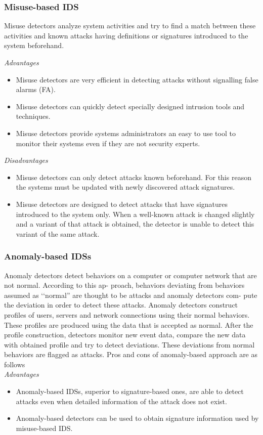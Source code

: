 \documentclass[12pt]{article}
\theoremstyle{definition}
\begin{document}
			\subsubsection{Misuse-based IDS}
			Misuse detectors analyze system activities and try to find a match between these activities and known attacks having
			definitions or signatures introduced to the system beforehand.
			
			\textit{Advantages}
			\begin{itemize}
				
				\item Misuse detectors are very efficient in detecting attacks without signalling false alarms (FA).
				
				\item Misuse detectors can quickly detect specially designed intrusion tools and techniques.
				\item Misuse detectors provide systems administrators an easy to use tool to monitor their systems even if they are not security
				experts.
			\end{itemize}
			
			\textit{Disadvantages}
			\begin{itemize}
				\item Misuse detectors can only detect attacks known beforehand. For this reason the systems must be updated with newly discovered attack signatures.
				
				\item Misuse detectors are designed to detect attacks that have signatures introduced to the system only. When a well-known attack is changed slightly and a variant of that attack is obtained, the detector is unable to detect this variant of the same attack.
			\end{itemize}
		
			\subsubsection{Anomaly-based IDSs}
			Anomaly detectors detect behaviors on a computer or computer network that are not normal. According to this ap-
			proach, behaviors deviating from behaviors assumed as ‘‘normal” are thought to be attacks and anomaly detectors com-
			pute the deviation in order to detect these attacks. Anomaly detectors construct profiles of users, servers and network
			connections using their normal behaviors. These profiles are produced using the data that is accepted as normal. After
			the profile construction, detectors monitor new event data, compare the new data with obtained profile and try to detect
			deviations. These deviations from normal behaviors are flagged as attacks. Pros and cons of anomaly-based approach are as follows\\
			\textit{Advantages}
			\begin{itemize}
				\item Anomaly-based IDSs, superior to signature-based ones, are able to detect attacks even when detailed information of the attack does not exist.
				\item Anomaly-based detectors can be used to obtain signature information used by misuse-based IDS.
			\end{itemize} 
		
\end{document}
